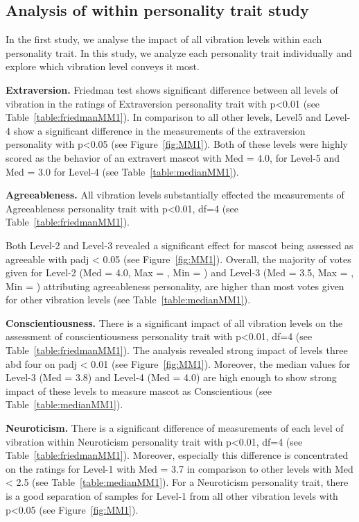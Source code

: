 \subsection{Analysis of within personality trait study}
\label{subsec:MMstudy1}
In the first study, we analyse the impact of all vibration levels within each personality trait.
In this study, we analyze each personality trait individually and explore which vibration
level conveys it most.

\par\textbf{Extraversion.}
Friedman test shows significant difference between all levels of vibration in the
ratings of Extraversion personality trait with p<0.01 (see Table~\ref{table:friedmanMM1}).
In comparison to all other levels, Level5 and Level-4 show a significant difference
in the measurements of the extraversion personality with p<0.05 (see Figure~\ref{fig:MM1}).
Both of these levels were highly scored as the behavior of an extravert mascot
with Med = 4.0, for Level-5 and Med = 3.0 for Level-4 (see Table~\ref{table:medianMM1}).

\par\textbf{Agreeableness.}
All vibration levels substantially effected the measurements of Agreeableness personality
trait with p<0.01, df=4 (see Table~\ref{table:friedmanMM1}).

Both Level-2 and Level-3 revealed a significant effect for mascot being
assessed as agreeable with padj < 0.05 (see Figure~\ref{fig:MM1}).
Overall, the majority of votes given for Level-2 (Med = 4.0, Max = , Min = ) and Level-3
(Med = 3.5, Max = , Min = ) attributing agreeableness personality, are higher than most
votes given for other vibration levels (see Table~\ref{table:medianMM1}).

\par\textbf{Conscientiousness.}
There is a significant impact of all vibration levels on the assessment of conscientiousness
personality trait with p<0.01, df=4 (see Table~\ref{table:friedmanMM1}).
The analysis revealed strong impact of levels three abd four on padj < 0.01 (see Figure~\ref{fig:MM1}).
Moreover, the median values for Level-3 (Med = 3.8) and Level-4 (Med = 4.0) are high enough
to show strong impact of these levels to measure mascot as Conscientious (see Table~\ref{table:medianMM1}).

\par\textbf{Neuroticism.}
There is a significant difference of measurements of each level of vibration within Neuroticism
personality trait with p<0.01, df=4 (see Table~\ref{table:friedmanMM1}).
Moreover, especially this difference is concentrated on the ratings for Level-1 with Med = 3.7
in comparison to other levels with Med < 2.5 (see Table~\ref{table:medianMM1}).
For a Neuroticism personality trait, there is a good separation of samples for Level-1
from all other vibration levels with p<0.05 (see Figure~\ref{fig:MM1}).

